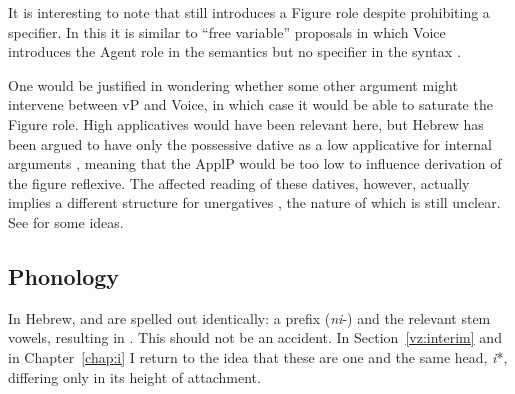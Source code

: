 It is interesting to note that {\pz} still introduces a Figure role despite prohibiting a specifier. In this it is similar to ``free variable'' proposals in which Voice introduces the Agent role in the semantics but no specifier in the syntax \citep{legate14,akkus19jl}.

One would be justified in wondering whether some other argument might intervene between vP and Voice, in which case it would be able to saturate the Figure role. High applicatives would have been relevant here, but Hebrew has been argued to have only the possessive dative as a low applicative for internal arguments \citep[46]{pylkkanen08}, meaning that the ApplP would be too low to influence derivation of the figure reflexive. The affected reading of these datives, however, actually implies a different structure for unergatives \citep[59]{pylkkanen08}, the nature of which is still unclear. See \cite{barashersiegalboneh15,barashersiegalboneh16} for some ideas.
	
	\subsection{Phonology} \label{vz:pz:phono}
In Hebrew, {\vz} and {\pz} are spelled out identically: a prefix (\emph{ni}-) and the relevant stem vowels, resulting in {\tnif}. This should not be an accident. In Section~\ref{vz:interim} and in Chapter~\ref{chap:i} I return to the idea that these are one and the same head, \emph{i}*, differing only in its height of attachment.

